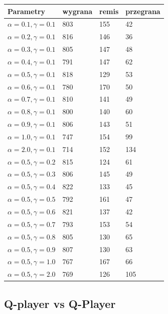 \documentclass{article}
\begin{document}
\begin{center}
  \begin{tabular}{|l|l|l|l|}
    \hline
    Parametry & wygrana & remis & przegrana \\ \hline
    $\alpha = 0.1, \gamma = 0.1$ & 803 & 155 & 42 \\ \hline
    $\alpha = 0.2, \gamma = 0.1$ & 816 & 146 & 36 \\ \hline
    $\alpha = 0.3, \gamma = 0.1$ & 805 & 147 & 48 \\ \hline
    $\alpha = 0.4, \gamma = 0.1$ & 791 & 147 & 62 \\ \hline
    $\alpha = 0.5, \gamma = 0.1$ & 818 & 129 & 53 \\ \hline
    $\alpha = 0.6, \gamma = 0.1$ & 780 & 170 & 50 \\ \hline
    $\alpha = 0.7, \gamma = 0.1$ & 810 & 141 & 49 \\ \hline
    $\alpha = 0.8, \gamma = 0.1$ & 800 & 140 & 60 \\ \hline
    $\alpha = 0.9, \gamma = 0.1$ & 806 & 143 & 51 \\ \hline
    $\alpha = 1.0, \gamma = 0.1$ & 747 & 154 & 99 \\ \hline
    $\alpha = 2.0, \gamma = 0.1$ & 714 & 152 & 134 \\ \hline\hline
    $\alpha = 0.5, \gamma = 0.2$ & 815 & 124 & 61 \\ \hline
    $\alpha = 0.5, \gamma = 0.3$ & 806 & 145 & 49 \\ \hline
    $\alpha = 0.5, \gamma = 0.4$ & 822 & 133 & 45 \\ \hline
    $\alpha = 0.5, \gamma = 0.5$ & 792 & 161 & 47 \\ \hline
    $\alpha = 0.5, \gamma = 0.6$ & 821 & 137 & 42 \\ \hline
    $\alpha = 0.5, \gamma = 0.7$ & 793 & 153 & 54 \\ \hline
    $\alpha = 0.5, \gamma = 0.8$ & 805 & 130 & 65 \\ \hline
    $\alpha = 0.5, \gamma = 0.9$ & 807 & 130 & 63 \\ \hline
    $\alpha = 0.5, \gamma = 1.0$ & 767 & 167 & 66 \\ \hline
    $\alpha = 0.5, \gamma = 2.0$ & 769 & 126 & 105 \\ \hline
  \end{tabular}
\end{center}

\subsection{Q-player vs Q-Player}
\end{document}
